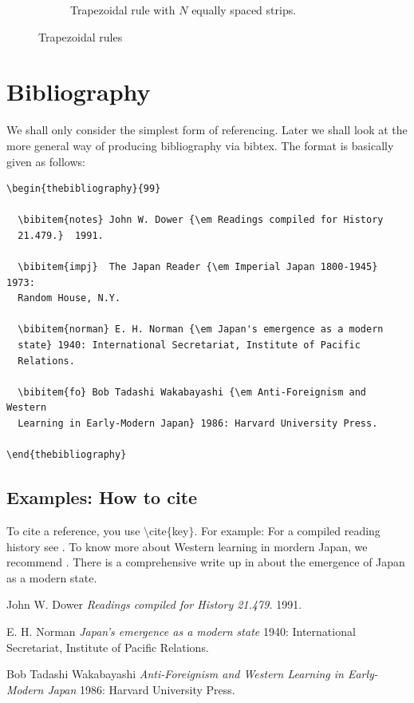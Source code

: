 \documentclass[12pt,a4paper]{article}
\begin{document}
\begin{figure}
\begin{subfigure}[b]{0.4\textwidth}
        \caption{Trapezoidal rule with $N$ equally spaced strips.}
        \label{fig:trapez2}
    \end{subfigure}
    \caption{Trapezoidal rules}\label{fig:trapez}
\end{figure}

\newpage
\section{Bibliography}
We shall only consider the simplest form of referencing. Later we shall look at the more general way of producing bibliography via bibtex. The format is basically given as follows:

\begin{verbatim}
\begin{thebibliography}{99}

  \bibitem{notes} John W. Dower {\em Readings compiled for History
  21.479.}  1991.

  \bibitem{impj}  The Japan Reader {\em Imperial Japan 1800-1945} 1973:
  Random House, N.Y.

  \bibitem{norman} E. H. Norman {\em Japan's emergence as a modern
  state} 1940: International Secretariat, Institute of Pacific
  Relations.

  \bibitem{fo} Bob Tadashi Wakabayashi {\em Anti-Foreignism and Western
  Learning in Early-Modern Japan} 1986: Harvard University Press.

\end{thebibliography}
\end{verbatim}

\subsection{Examples: How to cite}
To cite a reference, you use  $\setminus$cite$\{$key$\}$. For example: For a compiled reading history see \cite{notes}. To know more about Western learning in mordern Japan, we recommend \cite{fo, notes}. There is a comprehensive write up in \cite{norman} about the emergence of Japan as a modern state.

\newpage
\begin{thebibliography}{99}

   John W. Dower {\em Readings compiled for History
  21.479.}  1991.
  
   E. H. Norman {\em Japan's emergence as a modern
  state} 1940: International Secretariat, Institute of Pacific
  Relations.

   Bob Tadashi Wakabayashi {\em Anti-Foreignism and Western Learning in Early-Modern Japan} 1986: Harvard University Press.
\end{thebibliography}
\end{document}
